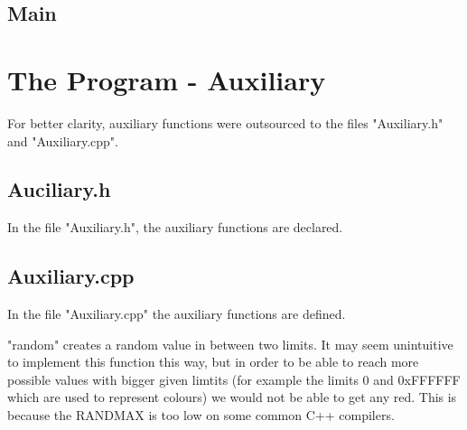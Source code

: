 \documentclass[11pt,titlepage]{article}
\def\ContinueLineNumber{\lstset{firstnumber=last}}
\begin{document}
		\subsection{Main}
			\ContinueLineNumber
			
			
\newpage			
		\section{The Program - Auxiliary}
		For better clarity, auxiliary functions were outsourced to the files 
		"Auxiliary.h" and "Auxiliary.cpp".
			\subsection{Auciliary.h}
			In the file "Auxiliary.h", the auxiliary functions are declared.
				\lstset{firstnumber=1}
				
			\subsection{Auxiliary.cpp}
			In the file "Auxiliary.cpp" the auxiliary functions are defined.
			
			"random" creates a random value in between two limits. It may seem unintuitive to implement this function this way, but in order to be able to reach more possible values with bigger given limtits (for example the limits 0 and 0xFFFFFF which are used to represent colours) we would not be able to get any red. This is because the RAND\textunderscore MAX is too low on some common C++ compilers.
				
\end{document}
